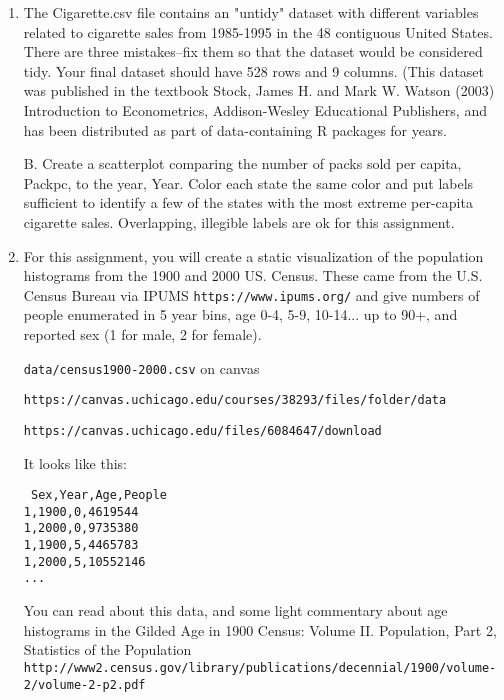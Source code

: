 \documentclass[]{book}
\theoremstyle{definition}
\begin{document}
\begin{enumerate}
\item\label{cigarettes}

The Cigarette.csv file contains an "untidy" dataset with different variables related to cigarette sales from 1985-1995 in the 48 contiguous United States. There are three mistakes–fix them so that the dataset would be considered tidy. Your final dataset should have 528 rows and 9 columns.  (This dataset was published in the textbook Stock, James H. and Mark W. Watson (2003) Introduction to Econometrics, Addison-Wesley Educational Publishers, and has been distributed as part of data-containing R packages for years. 

B. Create a scatterplot comparing the number of packs sold per capita, Packpc, to the year, Year. Color each state the same color and put labels sufficient to identify a few of the states with the most extreme per-capita cigarette sales.  Overlapping, illegible labels are ok for this assignment.

\item\label{census}

For this assignment, you will create a static visualization of the population histograms from the 1900 and 2000 US. Census.  These came from the U.S. Census Bureau via IPUMS \texttt{https://www.ipums.org/} and give numbers of people enumerated in 5 year bins, age 0-4, 5-9, 10-14... up to 90+, and reported sex (1 for male, 2 for female).

\texttt{data/census1900-2000.csv}  on canvas

\texttt{https://canvas.uchicago.edu/courses/38293/files/folder/data} 

\texttt{https://canvas.uchicago.edu/files/6084647/download}

It looks like this:

\texttt{
Sex,Year,Age,People \\
1,1900,0,4619544\\
1,2000,0,9735380\\
1,1900,5,4465783\\
1,2000,5,10552146 \\
...
}

You can read about this data, and some light commentary about age histograms in the Gilded Age in
1900 Census: Volume II. Population, Part 2, Statistics of the Population \\
\texttt{http://www2.census.gov/library/publications/decennial/1900/volume-2/volume-2-p2.pdf}


\end{enumerate}
\end{document}
